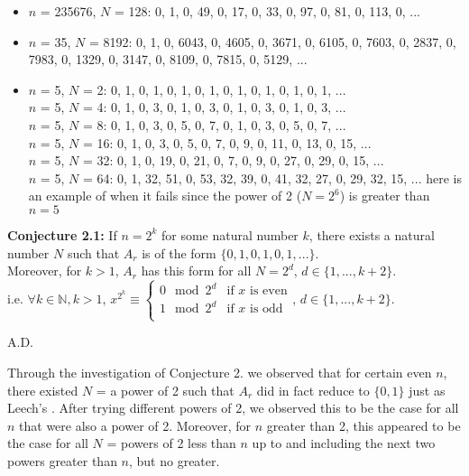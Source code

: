 \documentclass{article}
\begin{document}
\begin{flushleft}
\begin{itemize}
        \item $n$ = 235676, $N$ = 128:  0, 1, 0, 49, 0, 17, 0, 33, 0, 97, 0, 81, 0, 113, 0, ...
        \item $n$ = 35, $N$ = 8192:  0, 1, 0, 6043, 0, 4605, 0, 3671, 0, 6105, 0, 7603, 0, 2837, 0, 7983, 0, 1329, 0, 3147, 0, 8109, 0, 7815, 0, 5129, ...
        \item $n$ = 5, $N$ = 2:  0, 1, 0, 1, 0, 1, 0, 1, 0, 1, 0, 1, 0, 1, 0, 1, ...
            \\ $n$ = 5, $N$ = 4:  0, 1, 0, 3, 0, 1, 0, 3, 0, 1, 0, 3, 0, 1, 0, 3, ...
            \\ $n$ = 5, $N$ = 8:  0, 1, 0, 3, 0, 5, 0, 7, 0, 1, 0, 3, 0, 5, 0, 7, ...
            \\ $n$ = 5, $N$ = 16:  0, 1, 0, 3, 0, 5, 0, 7, 0, 9, 0, 11, 0, 13, 0, 15, ...
            \\ $n$ = 5, $N$ = 32:  0, 1, 0, 19, 0, 21, 0, 7, 0, 9, 0, 27, 0, 29, 0, 15, ...
            \\ $n$ = 5, $N$ = 64:  0, 1, 32, 51, 0, 53, 32, 39, 0, 41, 32, 27, 0, 29, 32, 15, ...
            here is an example of when it fails since the power of 2 ($N=2^6$) is greater than $n=5$
    \end{itemize}
    
\vspace{.1in}

{\bf Conjecture 2.1:} If $n=2^k$ for some natural number $k$, there exists a natural number $N$ such that $A_r$ is of the form $\{0,1,0,1,0,1,...\}$. \\
Moreover, for $k>1$, $A_r$ has this form for all $N=2^d$, $d\in\{1,...,k+2\}$. \\
    \vspace{.1in}
    \hspace{.2in} i.e. $\forall k\in{\mathbb{N}},k>1$, $x^{2^k}\equiv 
    \begin{cases}
        0\mod 2^d  &  \text{if $x$ is even}\\
        1\mod 2^d  &  \text{if $x$ is odd}\\
    \end{cases}$, $d\in\{1,...,k+2\}$.

    \hspace{4.3in} A.D.

    Through the investigation of Conjecture 2. we observed that for certain even $n$, there existed $N$ = a power of 2 such that $A_r$ did in fact reduce to $\{0,1\}$ just as Leech's \cite{leech}. After trying different powers of 2, we observed this to be the case for all $n$ that were also a power of 2. Moreover, for $n$ greater than 2, this appeared to be the case for all $N$ = powers of 2 less than $n$ up to and including the next two powers greater than $n$, but no greater. 
    

\end{flushleft}
\end{document}
